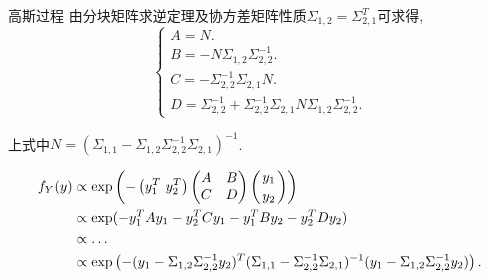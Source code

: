 \documentclass[10pt,mathserif]{beamer}
\theoremstyle{definition}
\numberwithin{equation}{section} %
\begin{document}
    \begin{frame}[fragile]{高斯过程}
        由分块矩阵求逆定理及协方差矩阵性质$\Sigma_{1,2}=\Sigma^{T}_{2,1}$可求得, 
        \begin{equation}
            \begin{cases}
                A=N. \\
                B=-N\Sigma_{1,2}\Sigma_{2,2}^{-1}. \\ 
                C=-\Sigma_{2,2}^{-1}\Sigma_{2,1}N. \\
                D=\Sigma_{2,2}^{-1}+\Sigma_{2,2}^{-1}\Sigma_{2,1}N\Sigma_{1,2}\Sigma_{2,2}^{-1}. 
            \end{cases} 
        \end{equation}

        上式中$N=(\Sigma_{1,1}-\Sigma_{1,2}\Sigma^{-1}_{2,2}\Sigma_{2,1})^{-1}$.

        \begin{align}\label{A.10}
            f_{Y}(y)&\propto\mathrm{exp}\left( -\left(y^{T}_{1}\ y^{T}_{2}\right)
            \begin{pmatrix}
                A & B \\
                C & D \\
            \end{pmatrix}
            \left({y_{1}\atop y_{2}}\right)\right)\notag\\
            &\propto\mathrm{exp}(-y^{T}_{1}Ay_{1}-y^{T}_{2}Cy_{1}-y^{T}_{1}By_{2}-y^{T}_{2}Dy_{2} )\notag \\
            &\propto\dots \\ 
            &\propto\mathrm{exp}\left(-(y_{1}-\Sigma_{1,2}\Sigma^{-1}_{2,2}y_{2})^{T}(\Sigma_{1,1}-\Sigma^{-1}_{2,2}\Sigma_{2,1})^{-1}(y_{1}-\Sigma_{1,2}\Sigma^{-1}_{2,2}y_{2})\right). \notag
        \end{align}

    \end{frame}
\end{document}
